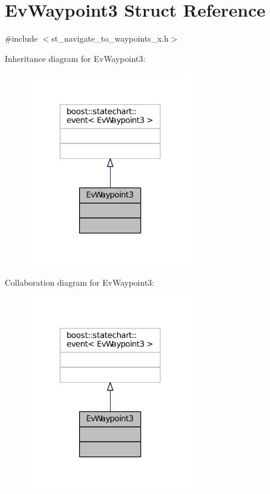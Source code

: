 \hypertarget{structEvWaypoint3}{}\section{Ev\+Waypoint3 Struct Reference}
\label{structEvWaypoint3}


{\ttfamily \#include $<$st\+\_\+navigate\+\_\+to\+\_\+waypoints\+\_\+x.\+h$>$}



Inheritance diagram for Ev\+Waypoint3\+:
\nopagebreak
\begin{figure}[H]
\begin{center}
\leavevmode
\includegraphics[width=206pt]{structEvWaypoint3__inherit__graph}
\end{center}
\end{figure}


Collaboration diagram for Ev\+Waypoint3\+:
\nopagebreak
\begin{figure}[H]
\begin{center}
\leavevmode
\includegraphics[width=206pt]{structEvWaypoint3__coll__graph}
\end{center}
\end{figure}


